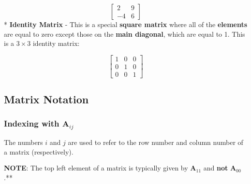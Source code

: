 \documentclass[11pt]{article}
\begin{document}
\[\begin{bmatrix}2 & 9 \\ -4 & 6 \end{bmatrix} \] * \textbf{Identity
Matrix} - This is a special \textbf{square matrix} where all of the
\textbf{elements} are equal to zero except those on the \textbf{main
diagonal}, which are equal to 1. This is a \(3\times 3\) identity
matrix:

\[\begin{bmatrix}1 & 0 & 0 \\ 0 & 1 & 0 \\ 0 & 0 & 1\end{bmatrix}\]

\hypertarget{matrix-notation}{%
\subsection{Matrix Notation}\label{matrix-notation}}

\hypertarget{indexing-with-mathbfa_ij}{%
\subsubsection{\texorpdfstring{Indexing with
\(\mathbf{A}_{ij}\)}{Indexing with \textbackslash{}mathbf\{A\}\_\{ij\}}}\label{indexing-with-mathbfa_ij}}

The numbers \(i\) and \(j\) are used to refer to the row number and
column number of a matrix (respectively).

\textbf{NOTE}: The top left element of a matrix is typically given by
\(\mathbf{A}_{11}\) and \textbf{not} \(\mathbf{A}_{00}\).**
\end{document}
